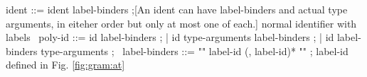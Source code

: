 \begin{syntax}
  ident ::= ident label-binders ;[An ident can have label-binders and actual type arguments, in eiteher order but only at most one of each.] normal identifier with labels
  \
  poly-id ::= id label-binders ;
  | id type-arguments label-binders ;
  | id label-binders type-arguments ;
  \
  label-binders ::= "{" label-id (, label-id)* "}" ; label-id defined in Fig. \ref{fig:gram:at}
\end{syntax}
